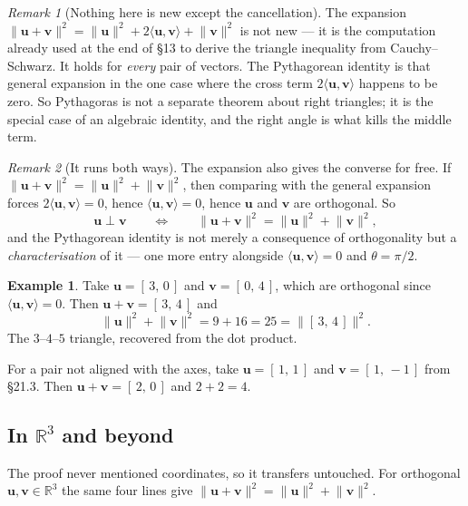 \documentclass[11pt]{article}
\theoremstyle{definition}
\newtheorem{ex}{Example}[section]
\theoremstyle{remark}
\newtheorem*{rmk}{Remark}
\newcommand{\R}{\mathbb{R}}
\newcommand{\vc}[1]{\mathbf{#1}}
\newcommand{\norm}[1]{\lVert #1\rVert}
\begin{document}
\begin{rmk}[Nothing here is new except the cancellation]
The expansion
$\norm{\vc{u}+\vc{v}}^{2}=\norm{\vc{u}}^{2}+2\langle\vc{u},\vc{v}\rangle+\norm{\vc{v}}^{2}$
is not new --- it is the computation already used at the end of \S13 to derive
the triangle inequality from Cauchy--Schwarz. It holds for \emph{every} pair of
vectors. The Pythagorean identity is that general expansion in the one case
where the cross term $2\langle\vc{u},\vc{v}\rangle$ happens to be zero. So
Pythagoras is not a separate theorem about right triangles; it is the special
case of an algebraic identity, and the right angle is what kills the middle
term.
\end{rmk}

\begin{rmk}[It runs both ways]
The expansion also gives the converse for free. If
$\norm{\vc{u}+\vc{v}}^{2}=\norm{\vc{u}}^{2}+\norm{\vc{v}}^{2}$, then comparing
with the general expansion forces $2\langle\vc{u},\vc{v}\rangle=0$, hence
$\langle\vc{u},\vc{v}\rangle=0$, hence $\vc{u}$ and $\vc{v}$ are orthogonal. So
\[
  \vc{u}\perp\vc{v}
  \qquad\Longleftrightarrow\qquad
  \norm{\vc{u}+\vc{v}}^{2}=\norm{\vc{u}}^{2}+\norm{\vc{v}}^{2} ,
\]
and the Pythagorean identity is not merely a consequence of orthogonality but a
\emph{characterisation} of it --- one more entry alongside
$\langle\vc{u},\vc{v}\rangle=0$ and $\theta=\pi/2$.
\end{rmk}

\begin{ex}
Take $\vc{u}=[\,3,\,0\,]$ and $\vc{v}=[\,0,\,4\,]$, which are orthogonal since
$\langle\vc{u},\vc{v}\rangle=0$. Then $\vc{u}+\vc{v}=[\,3,\,4\,]$ and
\[
  \norm{\vc{u}}^{2}+\norm{\vc{v}}^{2} = 9+16 = 25 = \norm{[\,3,\,4\,]}^{2} .
\]
The $3$--$4$--$5$ triangle, recovered from the dot product.

For a pair not aligned with the axes, take $\vc{u}=[\,1,\,1\,]$ and
$\vc{v}=[\,1,\,-1\,]$ from \S21.3. Then $\vc{u}+\vc{v}=[\,2,\,0\,]$ and
$2+2=4$. \checkmark
\end{ex}

\subsection{In \texorpdfstring{$\R^{3}$}{R3} and beyond}
The proof never mentioned coordinates, so it transfers untouched. For orthogonal
$\vc{u},\vc{v}\in\R^{3}$ the same four lines give
$\norm{\vc{u}+\vc{v}}^{2}=\norm{\vc{u}}^{2}+\norm{\vc{v}}^{2}$.
\end{document}
